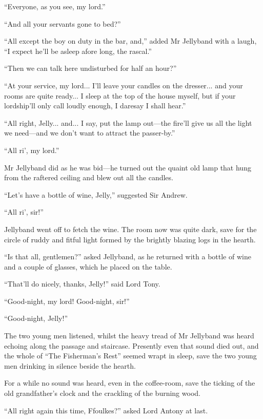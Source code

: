 \enquote{Everyone, as you see, my lord.}

\enquote{And all your servants gone to bed?}

\enquote{All except the boy on duty in the bar, and,} added Mr Jellyband with a laugh, \enquote{I expect he'll be asleep afore long, the rascal.}

\enquote{Then we can talk here undisturbed for half an hour?}

\enquote{At your service, my lord... I'll leave your candles on the dresser... and your rooms are quite ready... I sleep at the top of the house myself, but if your lordship'll only call loudly enough, I daresay I shall hear.}

\enquote{All right, Jelly... and... I say, put the lamp out---the fire'll give us all the light we need---and we don't want to attract the passer-by.}

\enquote{All ri’, my lord.}

Mr Jellyband did as he was bid---he turned out the quaint old lamp that hung from the raftered ceiling and blew out all the candles.

\enquote{Let's have a bottle of wine, Jelly,} suggested Sir Andrew.

\enquote{All ri’, sir!}

Jellyband went off to fetch the wine. The room now was quite dark, save for the circle of ruddy and fitful light formed by the brightly blazing logs in the hearth.

\enquote{Is that all, gentlemen?} asked Jellyband, as he returned with a bottle of wine and a couple of glasses, which he placed on the table.

\enquote{That'll do nicely, thanks, Jelly!} said Lord Tony.

\enquote{Good-night, my lord! Good-night, sir!}

\enquote{Good-night, Jelly!}

The two young men listened, whilst the heavy tread of Mr Jellyband was heard echoing along the passage and staircase. Presently even that sound died out, and the whole of \enquote{The Fisherman's Rest} seemed wrapt in sleep, save the two young men drinking in silence beside the hearth.

For a while no sound was heard, even in the coffee-room, save the ticking of the old grandfather's clock and the crackling of the burning wood.

\enquote{All right again this time, Ffoulkes?} asked Lord Antony at last.

